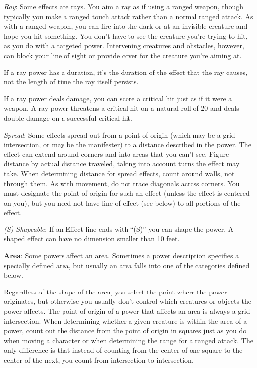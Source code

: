 \textit{Ray}: Some effects are rays. You aim a ray as if using a ranged weapon, though typically you make a ranged touch attack rather than a normal ranged attack. As with a ranged weapon, you can fire into the dark or at an invisible creature and hope you hit something. You don't have to see the creature you're trying to hit, as you do with a targeted power. Intervening creatures and obstacles, however, can block your line of sight or provide cover for the creature you're aiming at.

If a ray power has a duration, it's the duration of the effect that the ray causes, not the length of time the ray itself persists.

If a ray power deals damage, you can score a critical hit just as if it were a weapon. A ray power threatens a critical hit on a natural roll of 20 and deals double damage on a successful critical hit.

\textit{Spread}: Some effects spread out from a point of origin (which may be a grid intersection, or may be the manifester) to a distance described in the power. The effect can extend around corners and into areas that you can't see. Figure distance by actual distance traveled, taking into account turns the effect may take. When determining distance for spread effects, count around walls, not through them. As with movement, do not trace diagonals across corners. You must designate the point of origin for such an effect (unless the effect is centered on you), but you need not have line of effect (see below) to all portions of the effect.

\textit{(S) Shapeable}: If an Effect line ends with ``(S)'' you can shape the power. A shaped effect can have no dimension smaller than 10 feet.

\textbf{Area}: Some powers affect an area. Sometimes a power description specifies a specially defined area, but usually an area falls into one of the categories defined below.

Regardless of the shape of the area, you select the point where the power originates, but otherwise you usually don't control which creatures or objects the power affects. The point of origin of a power that affects an area is always a grid intersection. When determining whether a given creature is within the area of a power, count out the distance from the point of origin in squares just as you do when moving a character or when determining the range for a ranged attack. The only difference is that instead of counting from the center of one square to the center of the next, you count from intersection to intersection.

